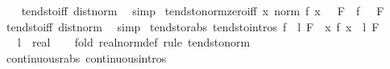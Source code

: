 \begin{isabellebody}
%
\isadelimproof
\ \ %
\endisadelimproof
%
\isatagproof
{}\isamarkupfalse%
\ tendsto{\isacharunderscore}{\kern0pt}iff\ dist{\isacharunderscore}{\kern0pt}norm\ \isamarkupfalse%
\ simp%
\endisatagproof
{\isafoldproof}%
%
\isadelimproof
\isanewline
%
\endisadelimproof
\isanewline
{}\isamarkupfalse%
\ tendsto{\isacharunderscore}{\kern0pt}norm{\isacharunderscore}{\kern0pt}zero{\isacharunderscore}{\kern0pt}iff{\isacharcolon}{\kern0pt}\ {\isachardoublequoteopen}{\isacharparenleft}{\kern0pt}{\isacharparenleft}{\kern0pt}{\isasymlambda}x{\isachardot}{\kern0pt}\ norm\ {\isacharparenleft}{\kern0pt}f\ x{\isacharparenright}{\kern0pt}{\isacharparenright}{\kern0pt}\ {\isasymlonglongrightarrow}\ {}{\isacharparenright}{\kern0pt}\ F\ {\isasymlongleftrightarrow}\ {\isacharparenleft}{\kern0pt}f\ {\isasymlonglongrightarrow}\ {}{\isacharparenright}{\kern0pt}\ F{\isachardoublequoteclose}\isanewline
%
\isadelimproof
\ \ %
\endisadelimproof
%
\isatagproof
{}\isamarkupfalse%
\ tendsto{\isacharunderscore}{\kern0pt}iff\ dist{\isacharunderscore}{\kern0pt}norm\ \isamarkupfalse%
\ simp%
\endisatagproof
{\isafoldproof}%
%
\isadelimproof
\isanewline
%
\endisadelimproof
\isanewline
{}\isamarkupfalse%
\ tendsto{\isacharunderscore}{\kern0pt}rabs\ {\isacharbrackleft}{\kern0pt}tendsto{\isacharunderscore}{\kern0pt}intros{\isacharbrackright}{\kern0pt}{\isacharcolon}{\kern0pt}\ {\isachardoublequoteopen}{\isacharparenleft}{\kern0pt}f\ {\isasymlonglongrightarrow}\ l{\isacharparenright}{\kern0pt}\ F\ {\isasymLongrightarrow}\ {\isacharparenleft}{\kern0pt}{\isacharparenleft}{\kern0pt}{\isasymlambda}x{\isachardot}{\kern0pt}\ {\isasymbar}f\ x{\isasymbar}{\isacharparenright}{\kern0pt}\ {\isasymlonglongrightarrow}\ {\isasymbar}l{\isasymbar}{\isacharparenright}{\kern0pt}\ F{\isachardoublequoteclose}\isanewline
\ \ \ l\ {\isacharcolon}{\kern0pt}{\isacharcolon}{\kern0pt}\ real\isanewline
%
\isadelimproof
\ \ %
\endisadelimproof
%
\isatagproof
{}\isamarkupfalse%
\ {\isacharparenleft}{\kern0pt}fold\ real{\isacharunderscore}{\kern0pt}norm{\isacharunderscore}{\kern0pt}def{\isacharparenright}{\kern0pt}\ {\isacharparenleft}{\kern0pt}rule\ tendsto{\isacharunderscore}{\kern0pt}norm{\isacharparenright}{\kern0pt}%
\endisatagproof
{\isafoldproof}%
%
\isadelimproof
\isanewline
%
\endisadelimproof
\isanewline
{}\isamarkupfalse%
\ continuous{\isacharunderscore}{\kern0pt}rabs\ {\isacharbrackleft}{\kern0pt}continuous{\isacharunderscore}{\kern0pt}intros{\isacharbrackright}{\kern0pt}{\isacharcolon}{\kern0pt}\isanewline

\end{isabellebody}

